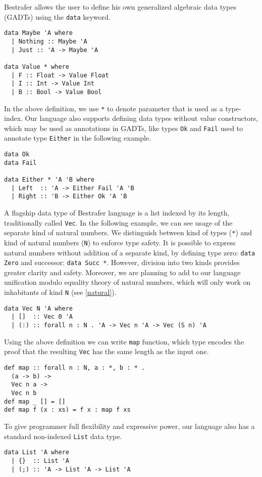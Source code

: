 \documentclass[declaration,shortabstract,english]{iithesis}
\begin{document}
Bestrafer allows the user to define his own generalized algebraic data types (GADTs)
using the \verb+data+ keyword.
\begin{verbatim}
data Maybe 'A where
  | Nothing :: Maybe 'A
  | Just :: 'A -> Maybe 'A

data Value * where
  | F :: Float -> Value Float
  | I :: Int -> Value Int
  | B :: Bool -> Value Bool
\end{verbatim}
In the above definition, we use \verb+*+ to denote parameter that is used as a type-index.
Our language also supports defining data types without value constructors, which may be used as annotations in GADTs,
like types \verb+Ok+ and \verb+Fail+ used to annotate type \verb+Either+ in the following example.
\begin{verbatim}
data Ok
data Fail

data Either * 'A 'B where
  | Left  :: 'A -> Either Fail 'A 'B
  | Right :: 'B -> Either Ok 'A 'B
\end{verbatim}
A flagship data type of Bestrafer language is a list indexed by its length, traditionally called \verb+Vec+.
In the following example, we can see usage of the separate kind of natural numbers. We distinguish between
kind of types (\verb+*+) and kind of natural numbers (\verb+N+) to enforce type safety. It is possible to express
natural numbers without addition of a separate kind, by defining type zero: \verb+data Zero+ and successor: \verb+data Succ *+.
However, division into two kinds provides greater clarity and safety. Moreover, we are planning to add to our language
unification modulo equality theory of natural numbers, which will only work on inhabitants of kind \verb+N+ (see \cref{natural}).
\begin{verbatim}
data Vec N 'A where
  | []  :: Vec 0 'A
  | (:) :: forall n : N . 'A -> Vec n 'A -> Vec (S n) 'A
\end{verbatim}
Using the above definition we can write \verb+map+ function, which type encodes the proof that the resulting \verb+Vec+ has the same
length as the input one.
\begin{verbatim}
def map :: forall n : N, a : *, b : * .
  (a -> b) ->
  Vec n a ->
  Vec n b
def map _ [] = []
def map f (x : xs) = f x : map f xs
\end{verbatim}
To give programmer full flexibility and expressive power, our language also has a standard non-indexed \verb+List+ data type.
\begin{verbatim}
data List 'A where
  | {}  :: List 'A
  | (;) :: 'A -> List 'A -> List 'A
\end{verbatim}
\end{document}
